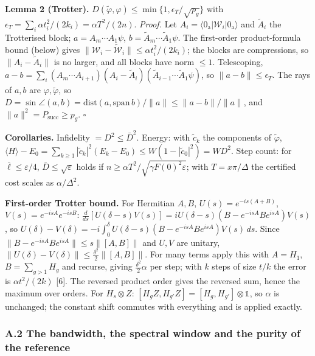 \documentclass[
]{article}
\begin{document}
\textbf{Lemma 2 (Trotter).}
\(D(\tilde\varphi,\varphi)\le\min\{1,\epsilon_T/\sqrt{p_g}\}\) with
\(\epsilon_T=\sum_i\alpha t_i^2/(2k_i)=\alpha T^2/(2n)\). \emph{Proof.}
Let \(A_i=\langle0_{\mathrm{a}}|\mathcal W_i|0_{\mathrm{a}}\rangle\) and
\(\tilde A_i\) the Trotterised block; \(a=A_m\cdots A_1\psi\),
\(b=\tilde A_m\cdots\tilde A_1\psi\). The first-order product-formula
bound (below) gives
\(\|\mathcal W_i-\widetilde{\mathcal W}_i\|\le\alpha t_i^2/(2k_i)\); the
blocks are compressions, so \(\|A_i-\tilde A_i\|\) is no larger, and all
blocks have norm \(\le1\). Telescoping,
\(a-b=\sum_i(A_m\cdots A_{i+1})(A_i-\tilde A_i)(\tilde A_{i-1}\cdots\tilde A_1\psi)\),
so \(\|a-b\|\le\epsilon_T\). The rays of \(a,b\) are
\(\varphi,\tilde\varphi\), so
\(D=\sin\angle(a,b)=\mathrm{dist}(a,\mathrm{span}\,b)/\|a\|\le\|a-b\|/\|a\|\),
and \(\|a\|^2=P_{\mathrm{succ}}\ge p_g\). \(\square\)

\textbf{Corollaries.} Infidelity \(=D^2\le\bar D^2\). Energy: with
\(\tilde c_k\) the components of \(\tilde\varphi\),
\(\langle H\rangle-E_0=\sum_{k\ge1}|\tilde c_k|^2(E_k-E_0)\le W(1-|\tilde c_0|^2)=WD^2\).
Step count: for \(\bar\ell\le\varepsilon/4\),
\(\bar D\le\sqrt\varepsilon\) holds if
\(n\ge\alpha T^2/\sqrt{\gamma F(0)^2\varepsilon}\); with
\(T=x\pi/\Delta\) the certified cost scales as \(\alpha/\Delta^2\).

\textbf{First-order Trotter bound.} For Hermitian \(A,B\),
\(U(s)=e^{-is(A+B)}\), \(V(s)=e^{-isA}e^{-isB}\):
\(\frac{d}{ds}[U(\delta-s)V(s)]=iU(\delta-s)(B-e^{-isA}Be^{isA})V(s)\),
so
\(U(\delta)-V(\delta)=-i\int_0^\delta U(\delta-s)(B-e^{-isA}Be^{isA})V(s)\,ds\).
Since \(\|B-e^{-isA}Be^{isA}\|\le s\|[A,B]\|\) and \(U,V\) are unitary,
\(\|U(\delta)-V(\delta)\|\le\tfrac{\delta^2}2\|[A,B]\|\). For many terms
apply this with \(A=H_1\), \(B=\sum_{g>1}H_g\) and recurse, giving
\(\frac{\delta^2}{2}\alpha\) per step; with \(k\) steps of size \(t/k\)
the error is \(\alpha t^2/(2k)\) {[}6{]}. The reversed product order
gives the reversed sum, hence the maximum over orders. For
\(H_s\otimes Z\): \([H_gZ,H_{g'}Z]=[H_g,H_{g'}]\otimes\mathbb 1\), so
\(\alpha\) is unchanged; the constant shift commutes with everything and
is applied exactly.

\hypertarget{a.2-the-bandwidth-the-spectral-window-and-the-purity-of-the-reference}{%
\subsubsection{A.2 The bandwidth, the spectral window and the purity of
the
reference}\label{a.2-the-bandwidth-the-spectral-window-and-the-purity-of-the-reference}}
\end{document}
